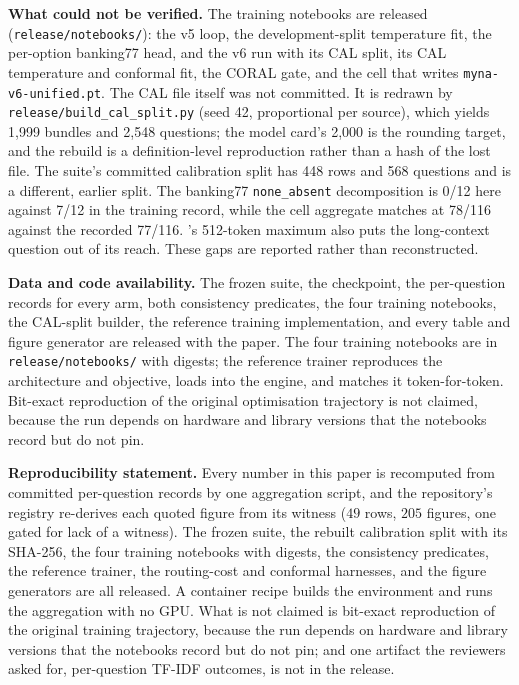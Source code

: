\textbf{What could not be verified.}
The training notebooks are released (\texttt{release/notebooks/}): the v5 loop, the
development-split temperature fit, the per-option banking77 head, and the v6 run with its CAL
split, its CAL temperature and conformal fit, the CORAL gate, and the cell that writes
\texttt{myna-v6-unified.pt}. The CAL file itself was not committed. It is redrawn by
\texttt{release/build\_cal\_split.py} (seed 42, proportional per source), which yields 1{,}999
bundles and 2{,}548 questions; the model card's 2{,}000 is the rounding target, and the rebuild is
a definition-level reproduction rather than a hash of the lost file. The suite's committed
calibration split has 448 rows and 568 questions and is a different, earlier split. The banking77 \texttt{none\_absent} decomposition is 0/12 here against 7/12 in the
training record, while the cell aggregate matches at 78/116 against the recorded 77/116.
\vsix{}'s 512-token maximum also puts the long-context question out of its reach. These gaps are
reported rather than reconstructed.

\textbf{Data and code availability.}
The frozen suite, the checkpoint, the per-question records for every \myna{} arm, both consistency
predicates, the four training notebooks, the CAL-split builder, the reference training
implementation, and every table and figure generator are released with the paper. The four
training notebooks are in \texttt{release/notebooks/} with digests; the reference trainer
reproduces the architecture and objective, loads into the engine, and matches it token-for-token.
Bit-exact reproduction of the original optimisation trajectory is not claimed, because the run
depends on hardware and library versions that the notebooks record but do not pin.

\textbf{Reproducibility statement.}
Every number in this paper is recomputed from committed per-question records by one aggregation
script, and the repository's registry re-derives each quoted figure from its witness
($49$ rows, $205$ figures, one gated for lack of a witness). The frozen suite, the rebuilt
calibration split with its SHA-256, the four training notebooks with digests, the consistency
predicates, the reference trainer, the routing-cost and conformal harnesses, and the figure
generators are all released. A container recipe builds the environment and runs the aggregation
with no GPU. What is not claimed is bit-exact reproduction of the original training trajectory,
because the run depends on hardware and library versions that the notebooks record but do not pin;
and one artifact the reviewers asked for, per-question TF-IDF outcomes, is not in the release.

